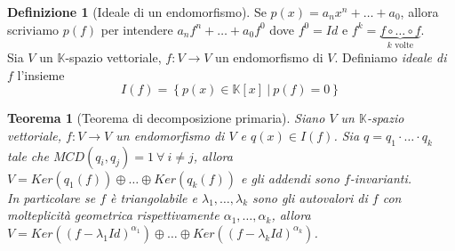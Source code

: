 \documentclass[11pt]{article}
\theoremstyle{plain}
\newtheorem{thm}{Teorema}[section]
\theoremstyle{definition}
\newtheorem{defn}{Definizione}[section]
\theoremstyle{remark}
\newcommand{\K}{\mathbb{K}}
\begin{document}
\begin{defn}[Ideale di un endomorfismo]
	Se $p(x)=a_n x^n+\ldots+a_0$, allora scriviamo $p(f)$ per intendere $a_nf^n+\ldots+a_0f^0$ dove $f^0=Id$ e $f^k=\underbrace{f\circ\ldots\circ f}_{k \text{ volte}}$.\\
	Sia $V$ un $\K$-spazio vettoriale, $f:V\to V$ un endomorfismo di $V$. Definiamo \textit{ideale di $f$} l'insieme
	\[
		I(f)=\left\{ p(x)\in \K[x]\ |\ p(f)=0 \right\}
	\]
	

\end{defn}


\begin{thm}[Teorema di decomposizione primaria]
\label{thm:dec_primaria}
	Siano $V$ un $\K$-spazio vettoriale, $f:V\to V$ un endomorfismo di $V$ e $q(x)\in I(f)$. Sia $q=q_1\cdot\ldots\cdot q_k$ tale che $MCD(q_i,q_j)=1\ \forall\ i\neq j$, allora $V=Ker(q_1(f))\oplus\dots\oplus Ker(q_k(f))$ e gli addendi sono $f$-invarianti.\\
	In particolare se $f$ è triangolabile e $\lambda_1,\ldots,\lambda_k$ sono gli autovalori di $f$ con molteplicità geometrica rispettivamente $\alpha_1,\ldots,\alpha_k$, allora $V=Ker\left((f-\lambda_1 Id)^{\alpha_1}\right)\oplus\dots\oplus Ker\left((f-\lambda_k Id)^{\alpha_k}\right)$.
\end{thm}
\end{document}
